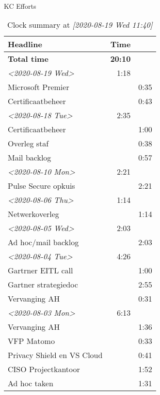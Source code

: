 \documentclass[11pt]{article}
\author{Koen Colpaert}
\date{\today}
\title{}
\begin{document}
\tableofcontents

KC Efforts

\begin{table}[htbp]
\caption{Clock summary at \textit{[2020-08-19 Wed 11:40]}}
\centering
\begin{tabular}{lrr}
Headline & Time & \\
\hline
\textbf{Total time} & \textbf{20:10} & \\
\hline
\textit{<2020-08-19 Wed>} & 1:18 & \\
\hspace*{1.0em}Microsoft Premier &  & 0:35\\
\hspace*{1.0em}Certificaatbeheer &  & 0:43\\
\textit{<2020-08-18 Tue>} & 2:35 & \\
\hspace*{1.0em}Certificaatbeheer &  & 1:00\\
\hspace*{1.0em}Overleg staf &  & 0:38\\
\hspace*{1.0em}Mail backlog &  & 0:57\\
\textit{<2020-08-10 Mon>} & 2:21 & \\
\hspace*{1.0em}Pulse Secure opkuis &  & 2:21\\
\textit{<2020-08-06 Thu>} & 1:14 & \\
\hspace*{1.0em}Netwerkoverleg &  & 1:14\\
\textit{<2020-08-05 Wed>} & 2:03 & \\
\hspace*{1.0em}Ad hoc/mail backlog &  & 2:03\\
\textit{<2020-08-04 Tue>} & 4:26 & \\
\hspace*{1.0em}Gartrner EITL call &  & 1:00\\
\hspace*{1.0em}Gartner strategiedoc &  & 2:55\\
\hspace*{1.0em}Vervanging AH &  & 0:31\\
\textit{<2020-08-03 Mon>} & 6:13 & \\
\hspace*{1.0em}Vervanging AH &  & 1:36\\
\hspace*{1.0em}VFP Matomo &  & 0:33\\
\hspace*{1.0em}Privacy Shield en VS Cloud &  & 0:41\\
\hspace*{1.0em}CISO Projectkantoor &  & 1:52\\
\hspace*{1.0em}Ad hoc taken &  & 1:31\\
\end{tabular}
\end{table}
\end{document}
